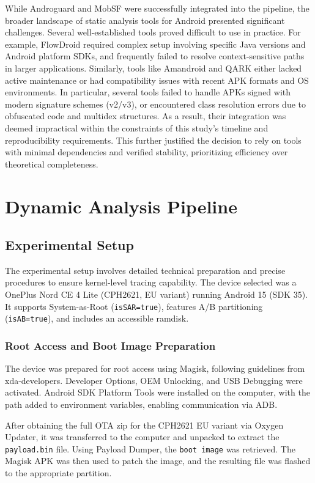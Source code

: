\documentclass[a4paper,12pt]{report}
\begin{document}
While Androguard and MobSF were successfully integrated into the pipeline, the broader landscape of static analysis tools for Android presented significant challenges. Several well-established tools proved difficult to use in practice. For example, FlowDroid required complex setup involving specific Java versions and Android platform SDKs, and frequently failed to resolve context-sensitive paths in larger applications. Similarly, tools like Amandroid and QARK either lacked active maintenance or had compatibility issues with recent APK formats and OS environments. In particular, several tools failed to handle APKs signed with modern signature schemes (v2/v3), or encountered class resolution errors due to obfuscated code and multidex structures. As a result, their integration was deemed impractical within the constraints of this study’s timeline and reproducibility requirements. This further justified the decision to rely on tools with minimal dependencies and verified stability, prioritizing efficiency over theoretical completeness.




\section{Dynamic Analysis Pipeline}
\subsection{Experimental Setup}

The experimental setup involves detailed technical preparation and precise procedures to ensure kernel-level tracing capability. The device selected was a OnePlus Nord CE 4 Lite (CPH2621, EU variant) running Android 15 (SDK 35). It supports System-as-Root (\texttt{isSAR=true}), features A/B partitioning (\texttt{isAB=true}), and includes an accessible ramdisk.

\subsubsection{Root Access and Boot Image Preparation}

The device was prepared for root access using Magisk, following guidelines from xda-developers. Developer Options, OEM Unlocking, and USB Debugging were activated. Android SDK Platform Tools were installed on the computer, with the path added to environment variables, enabling communication via ADB.

After obtaining the full OTA zip for the CPH2621 EU variant via Oxygen Updater, it was transferred to the computer and unpacked to extract the \texttt{payload.bin} file. Using Payload Dumper, the \texttt{boot image} was retrieved. The Magisk APK was then used to patch the image, and the resulting file was flashed to the appropriate partition.
\end{document}

